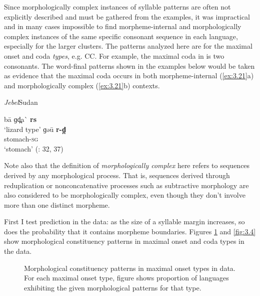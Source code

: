   Since morphologically complex instances of syllable patterns are often not explicitly described and must be gathered from the examples, it was impractical and in many cases impossible to find morpheme-internal and morphologically complex instances of the same specific consonant sequence in each language, especially for the larger clusters. The patterns analyzed here are for the maximal onset and coda \textit{types}, e.g. CC. For example, the maximal coda in  is two consonants. The word-final patterns shown in the examples below would be taken as evidence that the maximal coda occurs in both morpheme-internal (\ref{ex:3.21}a) and morphologically complex (\ref{ex:3.21}b) contexts.

\ea\label{ex:3.21}
 \textit{Jebel}{Sudan}

\ea  ba\={} ɡd̪a\`{} \textbf{rs}\\
\glt ‘lizard type’
\ex  ɡəu\={} \textbf{r-d̪}\\
stomach-\textsc{sg}\\
\glt ‘stomach’
(\citealt{Stirtz2011}: 32, 37)
\z
\z

  Note also that the definition of \textit{morphologically complex} here refers to sequences derived by any morphological process. That is, sequences derived through reduplication or nonconcatenative processes such as subtractive morphology are also considered to be morphologically complex, even though they don’t involve more than one distinct morpheme.

  First I test  prediction in the data: as the size of a syllable margin increases, so does the probability that it contains morpheme boundaries. Figures \ref{fig:3.3} and \ref{fig:3.4} show morphological constituency patterns in maximal onset and coda types in the data.

  
\begin{figure}
\caption{\label{fig:3.3}Morphological constituency patterns in maximal onset types in data. For each maximal onset type, figure shows proportion of languages exhibiting the given morphological patterns for that type.}
\end{figure}


